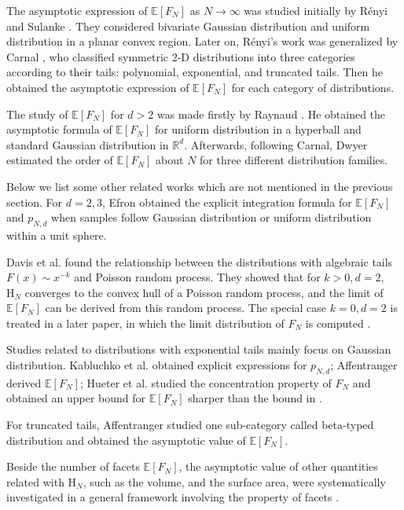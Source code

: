 \documentclass[conference,a4paper]{IEEEtran}
\def\E{\mathbb{E}}
\begin{document}
The asymptotic expression of $\E[F_N]$ as $N\to \infty$
was studied initially by R{\'e}nyi and Sulanke \cite{renyi1963konvexe}.
They considered
bivariate Gaussian distribution and uniform distribution
in a planar convex region.
Later on,  R{\'e}nyi's work was generalized by
Carnal \cite{carnal1970konvexe}, who
classified symmetric 2-D distributions
into three categories according to their tails:
polynomial, exponential, and truncated tails.
Then he obtained the asymptotic expression of $\E[F_N]$
for each category of distributions.




The study of $\E[F_N]$ for $d>2$ was made firstly by
Raynaud
\cite{raynaud1970enveloppe}.
He obtained the asymptotic formula of $\E[F_N]$
for uniform distribution in a hyperball
and standard Gaussian distribution in $\mathbb{R}^d$.
Afterwards, following Carnal, Dwyer \cite{dwyer1991convex}
estimated the order of $\E[F_N]$ about $N$
for three different distribution families.

Below we list some other related works which are not mentioned in the previous section.
For $d=2,3$, Efron \cite{efron1965convex} obtained the explicit integration formula for $\E[F_N]$ and $p_{N,d}$ 
when samples follow Gaussian distribution or uniform distribution within a unit sphere.

Davis et al. \cite{davis1987convex} found the relationship between the distributions with algebraic tails $F(x) \sim x^{-k}$ and Poisson random process.
They showed that for $k>0, d=2$,
$\mathrm{H}_N$ converges to the convex hull of a Poisson random process,
and
the limit of $\E[F_N]$ can be derived from this random process.
The special case $k=0, d=2$ is treated in a later paper, in which the
limit distribution of $F_N$ is computed \cite{aldous1991number}.

Studies related to distributions with exponential tails mainly focus on Gaussian distribution.
Kabluchko et al. \cite{kabluchko2020absorption} obtained explicit expressions for $p_{N,d}$;
Affentranger \cite{affentranger1991convex} derived $\E[F_N]$;
Hueter et al. \cite{hueter1999limit} studied the concentration property of $F_N$ and obtained
an upper bound for $\E[F_N]$ sharper than the bound in \cite{dwyer1991convex}.

For truncated tails,
Affentranger \cite{affentranger1991convex} studied one sub-category called beta-typed distribution and obtained
the asymptotic value of $\E[F_N]$.

Beside the number of facets $\E[F_N]$,
the asymptotic value of other quantities related with $\mathrm{H}_N$, such as the volume, and the surface area,
were systematically investigated in a general framework involving the property of facets
\cite{schneider2008stochastic, barany2008random}.
\end{document}
